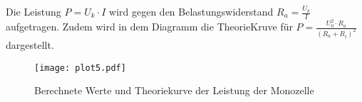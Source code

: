 Die Leistung $P=U_k \cdot I$ wird gegen den Belastungswiderstand $R_a = \frac{U_k}{I}$ aufgetragen. Zudem wird in dem
Diagramm die TheorieKruve für $P = \frac{U_0^2 \cdot R_a}{(R_a + R_i)^2}$ dargestellt.

\begin{figure}[H]
  \centering
  \texttt{[image: plot5.pdf]}
  \caption{Berechnete Werte und Theoriekurve der Leistung der Monozelle}
  \label{fig:plot5}
\end{figure}
